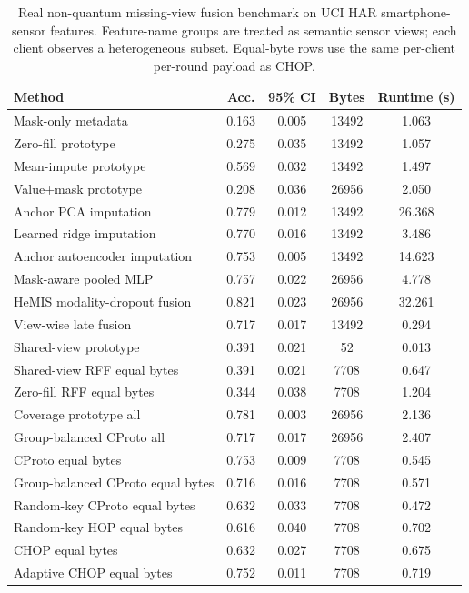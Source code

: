 \begin{table}[t]
\centering
\caption{Real non-quantum missing-view fusion benchmark on UCI HAR smartphone-sensor features. Feature-name groups are treated as semantic sensor views; each client observes a heterogeneous subset. Equal-byte rows use the same per-client per-round payload as CHOP.}
\label{tab:if-nonquantum-fusion}
\scriptsize
\setlength{\tabcolsep}{3pt}
\renewcommand{\arraystretch}{0.94}
\begin{tabular}{lcccc}
\toprule
Method & Acc. & 95\% CI & Bytes & Runtime (s) \\
\midrule
Mask-only metadata & 0.163 & 0.005 & 13492 & 1.063 \\
Zero-fill prototype & 0.275 & 0.035 & 13492 & 1.057 \\
Mean-impute prototype & 0.569 & 0.032 & 13492 & 1.497 \\
Value+mask prototype & 0.208 & 0.036 & 26956 & 2.050 \\
Anchor PCA imputation & 0.779 & 0.012 & 13492 & 26.368 \\
Learned ridge imputation & 0.770 & 0.016 & 13492 & 3.486 \\
Anchor autoencoder imputation & 0.753 & 0.005 & 13492 & 14.623 \\
Mask-aware pooled MLP & 0.757 & 0.022 & 26956 & 4.778 \\
HeMIS modality-dropout fusion & 0.821 & 0.023 & 26956 & 32.261 \\
View-wise late fusion & 0.717 & 0.017 & 13492 & 0.294 \\
Shared-view prototype & 0.391 & 0.021 & 52 & 0.013 \\
Shared-view RFF equal bytes & 0.391 & 0.021 & 7708 & 0.647 \\
Zero-fill RFF equal bytes & 0.344 & 0.038 & 7708 & 1.204 \\
Coverage prototype all & 0.781 & 0.003 & 26956 & 2.136 \\
Group-balanced CProto all & 0.717 & 0.017 & 26956 & 2.407 \\
CProto equal bytes & 0.753 & 0.009 & 7708 & 0.545 \\
Group-balanced CProto equal bytes & 0.716 & 0.016 & 7708 & 0.571 \\
Random-key CProto equal bytes & 0.632 & 0.033 & 7708 & 0.472 \\
Random-key HOP equal bytes & 0.616 & 0.040 & 7708 & 0.702 \\
CHOP equal bytes & 0.632 & 0.027 & 7708 & 0.675 \\
Adaptive CHOP equal bytes & 0.752 & 0.011 & 7708 & 0.719 \\
\bottomrule
\end{tabular}
\end{table}

